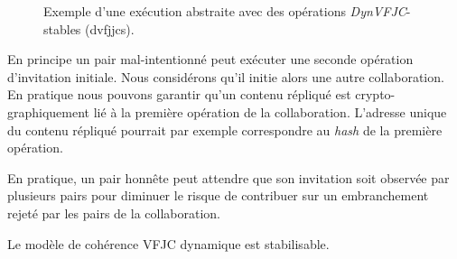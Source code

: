 \begin{figure}[htb]
\centering
{}
\caption[Stabilité \acl{VFJC} dynamique]{Exemple d'une exécution abstraite avec des opérations \emph{DynVFJC}-stables (dvfjjcs).}\label{fig:dvfjcs-example}
\end{figure}

En principe un pair mal-intentionné peut exécuter une seconde opération d'invitation initiale.
Nous considérons qu'il initie alors une autre collaboration.
En pratique nous pouvons garantir qu'un contenu répliqué est crypto-graphiquement lié à la première opération de la collaboration.
L'adresse unique du contenu répliqué pourrait par exemple correspondre au \emph{hash} de la première opération.

En pratique, un pair honnête peut attendre que son invitation soit observée par plusieurs pairs pour diminuer le risque de contribuer sur un embranchement rejeté par les pairs de la collaboration.

\begin{theorem}\label{th:stabilizable-dyn-vfjc}
Le modèle de cohérence \acl{VFJC} dynamique est stabilisable.
\end{theorem}

